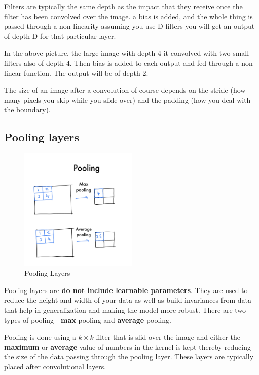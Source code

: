 \documentclass[
]{article}
\begin{document}
Filters are typically the same depth as the impact that they receive once the filter has been convolved over the image. a bias is added, and the whole thing is passed through a non-linearity assuming you use D filters you will get an output of depth D for that particular layer.

In the above picture, the large image with depth 4 it convolved with two small filters also of depth 4. Then bias is added to each output and fed through a non-linear function. The output will be of depth 2.

The size of an image after a convolution of course depends on the stride (how many pixels you skip while you slide over) and the padding (how you deal with the boundary).

\subsection{Pooling layers}\label{pooling-layers}

\begin{figure}
\centering
\includegraphics[width=0.5\textwidth,height=0.5\textheight]{images/pooling.jpeg}
\caption{Pooling Layers}
\end{figure}

Pooling layers are \textbf{do not include learnable parameters}. They are used to reduce the height and width of your data as well as build invariances from data that help in generalization and making the model more robust. There are two types of pooling - \textbf{max} pooling and \textbf{average} pooling.

Pooling is done using a \(k \times k\) filter that is slid over the image and either the \textbf{maximum} or \textbf{average} value of numbers in the kernel is kept thereby reducing the size of the data passing through the pooling layer. These layers are typically placed after convolutional layers.
\end{document}
